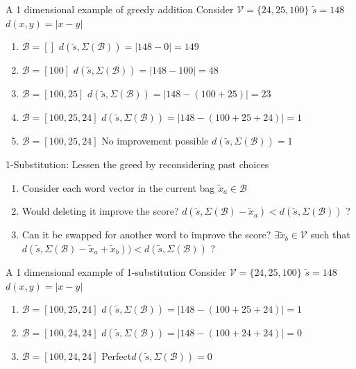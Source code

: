 \documentclass[]{beamer}
\newcommand{\s}{\tilde{s}}
\newcommand{\x}{\tilde{x}}
\newcommand{\V}{\mathcal{V}}
\renewcommand{\B}{\mathcal{B}}
\begin{document}
\begin{frame}{A 1 dimensional example of greedy addition}
	\vectorselectionproblemdefnalt
	\vfill
	Consider $\V=\{24,25,100\}$ \hfill $\s=148$ \hfill $d(x,y)=|x-y|$
	\begin{enumerate}
		\item<1-> $\B=[]$ \hfill $d(\s,\Sigma(\B))=|148-0|=149$ 
		\item<2-> $\B=[100]$ \hfill $d(\s,\Sigma(\B))=|148-100|=48$ 
		\item<3-> $\B=[100,25]$ \hfill $d(\s,\Sigma(\B))=|148-(100+25)|=23$ 
		\item<4-> $\B=[100,25,24]$ \hfill $d(\s,\Sigma(\B))=|148-(100+25+24)|=1$ 
		\item<5-> $\B=[100,25,24]$ \hfill No improvement possible \hfill $d(\s,\Sigma(\B))=1$ 
	\end{enumerate}
	\vfill
	\vfill
\end{frame}

\begin{frame}{1-Substitution: Lessen the greed by reconsidering past choices}
	\vectorselectionproblemdefnalt
	\vfill
	\begin{enumerate}
		\item Consider each word vector in the current bag $\x_a\in\B$
		\item Would deleting it improve the score? $d(\s,\Sigma(\B)-\x_a)<d(\s,\Sigma(\B))$ ?
		\item Can it be swapped for another word to improve the score?
		$\exists \x_b\in\V$ such that
		$d(\s,\Sigma(\B)-\x_a+\x_b))<d(\s,\Sigma(\B))$ ?
	\end{enumerate}
\end{frame}

\begin{frame}{A 1 dimensional example of 1-substitution}
	\vectorselectionproblemdefnalt
	\vfill
	Consider $\V=\{24,25,100\}$ \hfill $\s=148$ \hfill $d(x,y)=|x-y|$
	\begin{enumerate}
		\item<1-> $\B=[100,25,24]$ \hfill $d(\s,\Sigma(\B))=|148-(100+25+24)|=1$ 
		\item<2-> $\B=[100,24,24]$ \hfill $d(\s,\Sigma(\B))=|148-(100+24+24)|=0$ 
		\item<3-> $\B=[100,24,24]$ \hfill Perfect\hfill $d(\s,\Sigma(\B))=0$ 
	\end{enumerate}
	\vfill
	\vfill
\end{frame}
\end{document}
